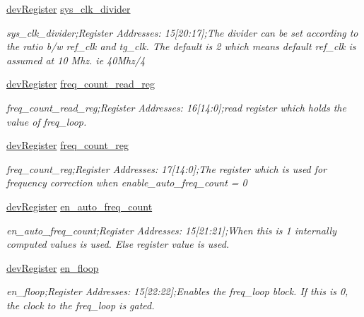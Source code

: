 \begin{DoxyCompactItemize}
\mbox{\hyperlink{classdev_register}{dev\+Register}} \mbox{\hyperlink{class_o_p_t3101_registers_ae70492bca941ebe87c775a0d0d9bd93a}{sys\+\_\+clk\+\_\+divider}}
\begin{DoxyCompactList}\small\item\em sys\+\_\+clk\+\_\+divider;Register Addresses\+: 15\mbox{[}20\+:17\mbox{]};The divider can be set according to the ratio b/w ref\+\_\+clk and tg\+\_\+clk. The default is 2 which means default ref\+\_\+clk is assumed at 10 Mhz. ie 40\+Mhz/4 \end{DoxyCompactList}\item 
\mbox{\hyperlink{classdev_register}{dev\+Register}} \mbox{\hyperlink{class_o_p_t3101_registers_a13c46fadc99502c2ad89f32cd563c78a}{freq\+\_\+count\+\_\+read\+\_\+reg}}
\begin{DoxyCompactList}\small\item\em freq\+\_\+count\+\_\+read\+\_\+reg;Register Addresses\+: 16\mbox{[}14\+:0\mbox{]};read register which holds the value of freq\+\_\+loop. \end{DoxyCompactList}\item 
\mbox{\hyperlink{classdev_register}{dev\+Register}} \mbox{\hyperlink{class_o_p_t3101_registers_acbf519ef46a522fcd6d135ff241379dd}{freq\+\_\+count\+\_\+reg}}
\begin{DoxyCompactList}\small\item\em freq\+\_\+count\+\_\+reg;Register Addresses\+: 17\mbox{[}14\+:0\mbox{]};The register which is used for frequency correction when enable\+\_\+auto\+\_\+freq\+\_\+count = \textquotesingle{}0\textquotesingle{} \end{DoxyCompactList}\item 
\mbox{\hyperlink{classdev_register}{dev\+Register}} \mbox{\hyperlink{class_o_p_t3101_registers_a384de0ec9e78c1d29c095aa60820eb20}{en\+\_\+auto\+\_\+freq\+\_\+count}}
\begin{DoxyCompactList}\small\item\em en\+\_\+auto\+\_\+freq\+\_\+count;Register Addresses\+: 15\mbox{[}21\+:21\mbox{]};When this is \textquotesingle{}1\textquotesingle{} internally computed values is used. Else register value is used. \end{DoxyCompactList}\item 
\mbox{\hyperlink{classdev_register}{dev\+Register}} \mbox{\hyperlink{class_o_p_t3101_registers_a2bb7d7d4ec062fa328510693777b181e}{en\+\_\+floop}}
\begin{DoxyCompactList}\small\item\em en\+\_\+floop;Register Addresses\+: 15\mbox{[}22\+:22\mbox{]};Enables the freq\+\_\+loop block. If this is \textquotesingle{}0\textquotesingle{}, the clock to the freq\+\_\+loop is gated. \end{DoxyCompactList}\item 

\end{DoxyCompactItemize}
